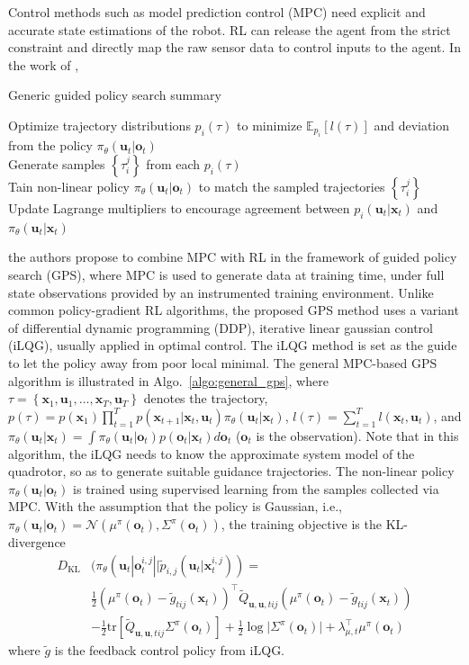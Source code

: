 \documentclass{article}
\newcommand{\B}[1]{\mathbf{#1}}
\begin{document}
Control methods such as model prediction control (MPC) need
explicit and accurate state estimations of the robot.
RL can release the agent from the strict constraint and 
directly map the raw sensor data to control inputs to the agent.
In the work of \textcite{zhang2016learning}, 
\begin{algorithm}
  \caption{Generic guided policy search summary}
  \label{algo:general_gps}
  {
    Optimize trajectory distributions $p_i(\tau)$ to minimize 
    $\mathbb{E}_{p_i}\left[l(\tau)\right]$ and deviation from 
    the policy $\pi_\theta(\B{u}_t | \B{o}_t)$ \\
    Generate samples $\left\{ \tau_i^j \right\}$ from each $p_i(\tau)$ \\
    Tain non-linear policy $\pi_\theta(\B{u}_t | \B{o}_t)$ to
    match the sampled trajectories $\left\{ \tau_i^j \right\}$ \\
    Update Lagrange multipliers to encourage agreement between
    $p_i(\B{u}_t | \B{x}_t)$ and $\pi_\theta(\B{u}_t | \B{x}_t)$
  }
\end{algorithm}
the authors propose to combine MPC with RL in the framework of guided policy search (GPS), where MPC is used to generate data at training time, under full state observations provided by an instrumented training environment.
Unlike common policy-gradient RL algorithms, the proposed GPS 
method uses a variant of differential dynamic programming (DDP), iterative
linear gaussian control (iLQG), usually applied in optimal 
control. 
The iLQG method is set as the guide to let the policy 
away from poor local minimal.
The general MPC-based GPS algorithm is illustrated in Algo.~\ref{algo:general_gps}, where $\tau = \left\{ \B{x}_1, \B{u}_1, \dots, \B{x}_T, \B{u}_T\right\}$ denotes the trajectory, 
$p(\tau) = p(\B{x}_1)\prod_{t=1}^{T}p(\B{x}_{t+1} | \B{x}_t, \B{u}_t)
\pi_\theta(\B{u}_t | \B{x}_t)$, 
$l(\tau) = \sum_{t=1}^T l(\B{x}_t, \B{u}_t)$, and 
$\pi_\theta(\B{u}_t | \B{x}_t) = \int \pi_\theta(\B{u}_t | \B{o}_t) p(\B{o}_t | \B{x}_t)d\B{o}_t$ 
($\B{o}_t$ is the observation).
Note that in this algorithm, the iLQG needs to know the approximate system
model of the quadrotor, so as to generate suitable guidance trajectories.
The non-linear policy $\pi_\theta(\B{u}_t | \B{o}_t)$ is trained 
using supervised learning from the samples collected via MPC.
With the assumption that the policy is Gaussian, i.e., 
$\pi_\theta(\B{u}_t | \B{o}_t) = \mathcal{N}(\mu^\pi(\B{o}_t), 
\Sigma^\pi(\B{o}_t))$, the training objective is the KL-divergence
\[
  \begin{aligned}
    D_\text{KL} & (
      \pi_\theta(\B{u}_t | \B{o}_t^{i,j} || 
      \tilde{p}_{i,j}(\B{u}_t | \B{x}_t^{i,j})) = \\
      &\frac{1}{2} (\mu^\pi(\B{o}_t) - \tilde{g}_{tij}(\B{x}_t))^\top
      \tilde{Q}_{\B{u},\B{u},tij}
      (\mu^\pi(\B{o}_t) - \tilde{g}_{tij}(\B{x}_t)) \\
      & -\frac{1}{2}\text{tr}\left[
        \tilde{Q}_{\B{u},\B{u},tij}\Sigma^\pi(\B{o}_t)
      \right]
      + \frac{1}{2}\log{\lvert \Sigma^\pi(\B{o}_t) \rvert}
      + \lambda^\top_{\mu,t}\mu^\pi(\B{o}_t)
  \end{aligned}
\]
where $\tilde{g}$ is the feedback control policy from iLQG.
\end{document}
